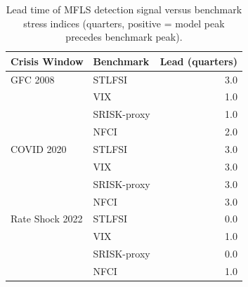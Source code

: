\begin{table}[h]
\centering
\caption{Lead time of MFLS detection signal versus benchmark stress indices (quarters, positive = model peak precedes benchmark peak).}
\label{tab:lead_times}
\begin{tabular}{llr}
\toprule
Crisis Window & Benchmark & Lead (quarters) \\
\midrule
GFC 2008 & STLFSI & 3.0 \\
 & VIX & 1.0 \\
 & SRISK-proxy & 1.0 \\
 & NFCI & 2.0 \\
COVID 2020 & STLFSI & 3.0 \\
 & VIX & 3.0 \\
 & SRISK-proxy & 3.0 \\
 & NFCI & 3.0 \\
Rate Shock 2022 & STLFSI & 0.0 \\
 & VIX & 1.0 \\
 & SRISK-proxy & 0.0 \\
 & NFCI & 1.0 \\
\bottomrule
\end{tabular}
\end{table}